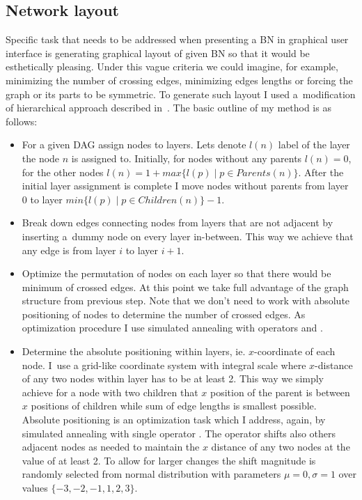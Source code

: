 \documentclass[english,cover]{fitthesis} %
\begin{document}
\subsection{Network layout}
Specific task that needs to be addressed when presenting a BN in graphical user interface is generating graphical layout of given BN so that it would be esthetically pleasing. Under this vague criteria we could imagine, for example, minimizing the number of crossing edges, minimizing edges lengths or forcing the graph or its parts to be symmetric. To generate such layout I used a~modification of hierarchical approach described in~\cite[p.~22]{graph_drawing}. The basic outline of my method is as follows:
\begin{itemize}
	\item For a given DAG assign nodes to layers. Lets denote $l(n)$ label of the layer the node $n$ is assigned to. Initially, for nodes without any parents $l(n)=0$, for the other nodes $l(n) = 1 + max \lbrace l(p) \mid p \in Parents(n)\rbrace$. After the initial layer assignment is complete I move nodes without parents from layer 0 to layer $min \lbrace l(p) \mid p \in Children(n)\rbrace - 1$.
	\item Break down edges connecting nodes from layers that are not adjacent by inserting a~dummy node on every layer in-between. This way we achieve that any edge is from layer $i$ to layer $i+1$.
	\item Optimize the permutation of nodes on each layer so that there would be minimum of crossed edges. At this point we take full advantage of the graph structure from previous step. Note that we don't need to work with absolute positioning of nodes to determine the number of crossed edges. As optimization procedure I use simulated annealing with operators  and .
    \item Determine the absolute positioning within layers, ie. $x$-coordinate of each node. I~use a grid-like coordinate system with integral scale where $x$-distance of any two nodes within layer has to be at least 2. This way we simply achieve for a node with two children that $x$ position of the parent is between $x$ positions of children while sum of edge lengths is smallest possible. Absolute positioning is an optimization task which I address, again, by simulated annealing with single operator . The operator shifts also others adjacent nodes as needed to maintain the $x$ distance of any two nodes at the value of at least 2. To allow for larger changes the shift magnitude is randomly selected from normal distribution with parameters $\mu=0, \sigma = 1$ over values $\lbrace -3, -2, -1, 1, 2, 3\rbrace$.
\end{itemize}
\end{document}

